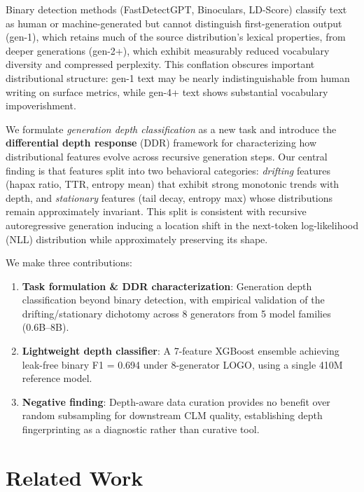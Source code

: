 \documentclass[11pt,a4paper]{article}
\begin{document}
Binary detection methods (FastDetectGPT, Binoculars, LD-Score) classify text as human or machine-generated but cannot distinguish first-generation output (gen-1), which retains much of the source distribution's lexical properties, from deeper generations (gen-2+), which exhibit measurably reduced vocabulary diversity and compressed perplexity. This conflation obscures important distributional structure: gen-1 text may be nearly indistinguishable from human writing on surface metrics, while gen-4+ text shows substantial vocabulary impoverishment.

We formulate \emph{generation depth classification} as a new task and introduce the \textbf{differential depth response} (DDR) framework for characterizing how distributional features evolve across recursive generation steps. Our central finding is that features split into two behavioral categories: \emph{drifting} features (hapax ratio, TTR, entropy mean) that exhibit strong monotonic trends with depth, and \emph{stationary} features (tail decay, entropy max) whose distributions remain approximately invariant. This split is consistent with recursive autoregressive generation inducing a location shift in the next-token log-likelihood (NLL) distribution while approximately preserving its shape.

We make three contributions:
\begin{enumerate}[nosep]
\item \textbf{Task formulation \& DDR characterization}: Generation depth classification beyond binary detection, with empirical validation of the drifting/stationary dichotomy across 8 generators from 5 model families (0.6B--8B).
\item \textbf{Lightweight depth classifier}: A 7-feature XGBoost ensemble achieving leak-free binary F1 = 0.694 under 8-generator LOGO, using a single 410M reference model.
\item \textbf{Negative finding}: Depth-aware data curation provides no benefit over random subsampling for downstream CLM quality, establishing depth fingerprinting as a diagnostic rather than curative tool.
\end{enumerate}

\section{Related Work}
\end{document}
